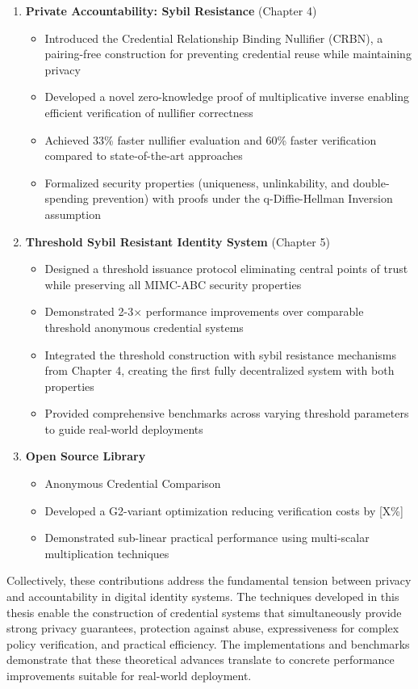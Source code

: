 \begin{enumerate}
    \item \textbf{Private Accountability: Sybil Resistance} (Chapter 4)
        \begin{itemize}
            \item Introduced the Credential Relationship Binding Nullifier (CRBN), a pairing-free construction for preventing credential reuse while maintaining privacy
            \item Developed a novel zero-knowledge proof of multiplicative inverse enabling efficient verification of nullifier correctness
            \item Achieved 33\% faster nullifier evaluation and 60\% faster verification compared to state-of-the-art approaches
            \item Formalized security properties (uniqueness, unlinkability, and double-spending prevention) with proofs under the q-Diffie-Hellman Inversion assumption
        \end{itemize}

    \item \textbf{Threshold Sybil Resistant Identity System} (Chapter 5)
        \begin{itemize}
            \item Designed a threshold issuance protocol eliminating central points of trust while preserving all MIMC-ABC security properties
            \item Demonstrated 2-3× performance improvements over comparable threshold anonymous credential systems
            \item Integrated the threshold construction with sybil resistance mechanisms from Chapter 4, creating the first fully decentralized system with both properties
            \item Provided comprehensive benchmarks across varying threshold parameters to guide real-world deployments
        \end{itemize}

        \item \textbf{Open Source Library}
        \begin{itemize}
            \item Anonymous Credential Comparison
            \item Developed a G2-variant optimization reducing verification costs by [X\%]
            \item Demonstrated sub-linear practical performance using multi-scalar multiplication techniques
        \end{itemize}
\end{enumerate}
Collectively, these contributions address the fundamental tension between privacy and accountability in digital identity systems. The techniques developed in this thesis enable the construction of credential systems that simultaneously provide strong privacy guarantees, protection against abuse, expressiveness for complex policy verification, and practical efficiency. The implementations and benchmarks demonstrate that these theoretical advances translate to concrete performance improvements suitable for real-world deployment.








